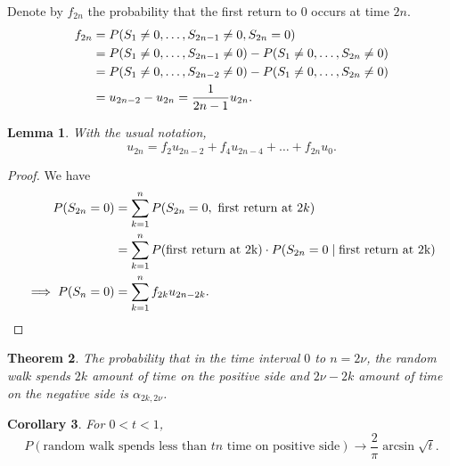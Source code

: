 \documentclass[15pt,a4paper]{book}
\newtheorem{theorem}{Theorem}[chapter]
\newtheorem{lemma}[theorem]{Lemma}
\newtheorem{corollary}[theorem]{Corollary}
\theoremstyle{definition}
\begin{document}
Denote by $f_{2n}$ the probability that the first return to 0 occurs at time $2n$.
\begin{align}
    f_{2n} &= P(S_{1} \neq 0, \ldots, S_{2n-1} \neq 0, S_{2n} = 0) \notag \notag \\
    &= P(S_{1} \neq 0, \ldots, S_{2n-1} \neq 0) - P(S_{1} \neq 0, \ldots, S_{2n} \neq 0) \notag \\
    &= P(S_{1} \neq 0, \ldots, S_{2n-2} \neq 0) - P(S_{1} \neq 0, \ldots, S_{2n} \neq 0) \notag \\
    &= u_{2n-2} - u_{2n} = \frac{1}{2n-1} u_{2n}.
\end{align}
\begin{lemma}
    With the usual notation,
    \begin{equation}
        u_{2n} = f_{2}u_{2n-2} + f_{4}u_{2n-4} + \ldots + f_{2n} u_{0}.
    \end{equation}
\end{lemma}
\begin{proof}
    We have
    \begin{align}
        P(S_{2n} = 0) &= \sum_{k=1}^{n} P(S_{2n}=0, \text{ first return at $2k$}) \notag\\
        &= \sum_{k=1}^{n} P(\text{first return at 2k}) \cdot P(S_{2n} = 0 \mid \text{first return at 2k}) \notag\\
        \implies P(S_{n} = 0) &= \sum_{k=1}^{n} f_{2k} u_{2n-2k}.
    \end{align}
\end{proof}
\begin{theorem}
    The probability that in the time interval $0$ to $n=2\nu$, the random walk spends $2k$ amount of time on the positive side and $2\nu-2k$ amount of time on the negative side is $\alpha_{2k,2\nu}$.
\end{theorem}
\begin{corollary}
    For $0 < t < 1$,
    \begin{equation}
        P(\text{random walk spends less than $tn$ time on positive side}) \to \frac{2}{\pi} \arcsin{\sqrt{t}}.
    \end{equation}
\end{corollary}
\end{document}
